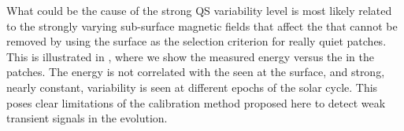 \documentclass{aa}
\begin{document}
What could be the cause of the strong QS variability level is most likely related to the strongly varying sub-surface magnetic fields that affect the \fff that cannot be removed by using the surface \brms{} as the selection criterion for really quiet patches. This is illustrated in , where we show the measured \fff energy versus the \brms{} in the patches. The \fff energy is not correlated with the \brms{} seen at the surface, and strong, nearly constant, variability is seen at different epochs of the solar cycle. This poses clear limitations of the calibration method proposed here to detect weak transient signals in the \fff evolution.






\end{document}
